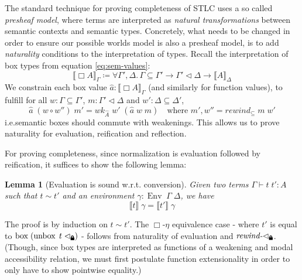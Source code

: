 \documentclass[12pt,twoside,openright]{report}
\numberwithin{equation}{chapter}
\numberwithin{figure}{chapter}
\numberwithin{table}{chapter}
\newtheorem{lemma}[theorem]{Lemma}
\theoremstyle{definition}\newtheorem{definition}{Definition}
\newcommand{\lock}{\text{\tikz[baseline]{
      \fill[rounded corners=.1ex] (-.75ex,0) rectangle (.75ex,1ex);
      \draw[line width=.3ex] (-.4ex,.5ex) -- ++(0,.75ex) arc (180:0:.4ex) -- ++(0,-.75ex);
}}}
\begin{document}
The standard technique for proving completeness of STLC \cite{altenkirch95,kovacs17}
uses a so called \emph{presheaf model},
where terms are interpreted as \emph{natural transformations}
between semantic contexts and semantic types.
Concretely, what needs to be changed in order to ensure
our possible worlds model is also a presheaf model,
is to add \emph{naturality} conditions to the interpretation of types.
Recall the interpretation of box types from equation \eqref{eq:sem-values}:
$$ \llbracket \Box A \rrbracket_\Gamma \coloneqq \forall \Gamma', \Delta. \, \Gamma \subseteq \Gamma' \to \Gamma'\lhd\Delta \to \llbracket A \rrbracket_\Delta $$
We constrain each box value $\hat a : \llbracket \Box A \rrbracket_\Gamma$
(and similarly for function values),
to fulfill for all $w : \Gamma \subseteq \Gamma'$, $m : \Gamma' \lhd \Delta$ and $w' : \Delta \subseteq \Delta'$,
$$ \hat a \; (w \circ w'') \; m' = \textit{wk}_{\widehat A} \; w' \; (\hat a \; w \; m) \quad \text{where } m' , w'' = \textit{rewind}_\subseteq \; m \; w' $$
i.e.\@ semantic boxes should commute with weakenings.
This allows us to prove naturality for evaluation, reification and reflection.

For proving completeness, since normalization is evaluation followed by reification,
it suffices to show the following lemma:
\begin{lemma}[Evaluation is sound w.r.t. conversion]
  Given two terms $\Gamma \vdash t \; t' : A$ such that $t \sim t'$
  and an environment $\gamma : \operatorname{Env} \; \Gamma \; \Delta$,
  we have
  $$ \llbracket t \rrbracket \; \gamma = \llbracket t' \rrbracket \; \gamma $$
\end{lemma}
The proof is by induction on $t \sim t'$.
The $\Box\text{-}\eta$ equivalence case -
where $t'$ is equal to $\operatorname{box} \; (\operatorname{unbox} \; t \; \lhd_\lock)$ -
follows from naturality of evaluation and $\textit{rewind-}\lhd_\lock$.
(Though, since box types are interpreted as functions
of a weakening and modal accessibility relation,
we must first postulate function extensionality
in order to only have to show pointwise equality.)
\end{document}
